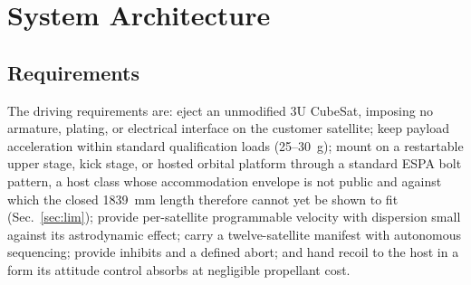 \documentclass[conference]{IEEEtran}
\begin{document}
\section{System Architecture}
\subsection{Requirements}
The driving requirements are: eject an unmodified 3U CubeSat, imposing no armature, plating, or electrical interface on the customer satellite; keep payload acceleration within standard qualification loads (25--30~g); mount on a restartable upper stage, kick stage, or hosted orbital platform through a standard ESPA bolt pattern, a host class whose accommodation envelope is not public and against which the closed 1839~mm length therefore cannot yet be shown to fit (Sec.~\ref{sec:lim}); provide per-satellite programmable velocity with dispersion small against its astrodynamic effect; carry a twelve-satellite manifest with autonomous sequencing; provide inhibits and a defined abort; and hand recoil to the host in a form its attitude control absorbs at negligible propellant cost.
\end{document}
